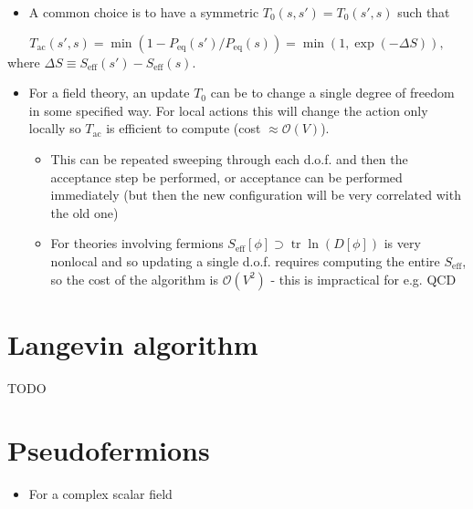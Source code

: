 \begin{itemize}
    \item A common choice is to have a symmetric $T_0(s,s') = T_0(s',s)$ such that
\end{itemize}
\begin{equation}
    T_\text{ac}(s', s) = \operatorname{min}(1-P_\text{eq}(s')/P_\text{eq}(s)) = \operatorname{min}(1, \exp{(-\Delta S)}),
\end{equation}
where $\Delta S \equiv S_\text{eff}(s') - S_\text{eff}(s)$.
\begin{itemize}
    \item For a field theory, an update $T_0$ can be to change a single degree of freedom in some specified way. For local actions this will change the action only locally so $T_\text{ac}$ is efficient to compute (cost $\approx \mathcal{O}(V)$).
    \begin{itemize}
        \item This can be repeated sweeping through each d.o.f. and then the acceptance step be performed, or acceptance can be performed immediately (but then the new configuration will be very correlated with the old one)
        \item For theories involving fermions $S_\text{eff}[\phi] \supset \operatorname{tr}\ln (D[\phi])$ is very nonlocal and so updating a single d.o.f. requires computing the entire $S_\text{eff}$, so the cost of the algorithm is $\mathcal{O}(V^2)$ - this is impractical for e.g. QCD
    \end{itemize}
\end{itemize}

\section{Langevin algorithm}
{ TODO}

\section{Pseudofermions}

\begin{itemize}
  \item For a complex scalar field
\end{itemize}

